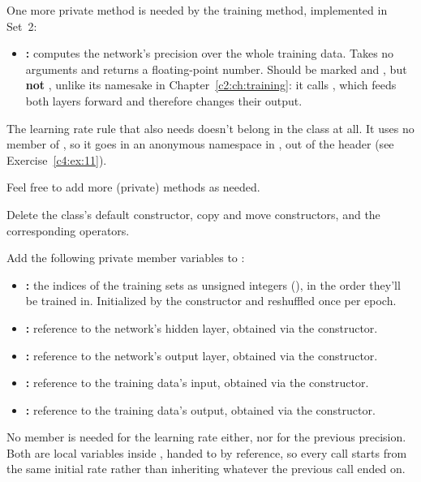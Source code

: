 One more private method is needed by the training method, implemented in Set~2:
\begin{itemize}
  \item \textbf{:} computes the network's precision over the whole training data.
    Takes no arguments and returns a floating-point number. Should be marked \code{[[nodiscard]]}
    and , but \textbf{not} , unlike its namesake in
    Chapter~\ref{c2:ch:training}: it calls , which feeds both layers forward and
    therefore changes their output.
\end{itemize}
The learning rate rule that  also needs doesn't belong in the class at all. It uses no
member of , so it goes in an anonymous namespace in , out of the
header (see Exercise~\ref{c4:ex:11}).

Feel free to add more (private) methods as needed.

\label{c4:ex:5}
Delete the class's default constructor, copy and move constructors, and the corresponding
operators.

\label{c4:ex:6}
Add the following private member variables to :
\begin{itemize}
  \item \textbf{:} the indices of the training sets as unsigned integers
    (), in the order they'll be trained in. Initialized by the constructor and
    reshuffled once per epoch.
  \item \textbf{:} reference to the network's hidden layer, obtained via the
    constructor.
  \item \textbf{:} reference to the network's output layer, obtained via the
    constructor.
  \item \textbf{:} reference to the training data's input, obtained via the
    constructor.
  \item \textbf{:} reference to the training data's output, obtained via the
    constructor.
\end{itemize}
No member is needed for the learning rate either, nor for the previous precision. Both are local
variables inside , handed to  by reference, so every call
starts from the same initial rate rather than inheriting whatever the previous call ended on.

